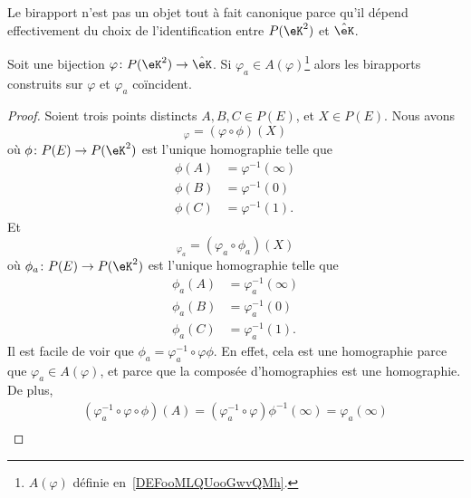 Le birapport n'est pas un objet tout à fait canonique parce qu'il dépend effectivement du choix de l'identification entre \( P(\eK^2)\) et \( \hat\eK\).

\begin{proposition}     \label{PROPooTFMQooIOQGvs}
    Soit une bijection \( \varphi\colon P(\eK^2)\to \hat\eK\). Si \( \varphi_a\in A(\varphi)\)\footnote{\( A(\varphi)\) définie en~\ref{DEFooMLQUooGwvQMh}.} alors les birapports construits sur \( \varphi\) et \( \varphi_a\) coïncident.
\end{proposition}

\begin{proof}
    Soient trois points distincts \( A,B,C\in P(E)\), et \( X\in P(E)\). Nous avons
    \begin{equation}
        [A,B,C,X]_{\varphi}=(\varphi\circ\phi)(X)
    \end{equation}
    où \( \phi\colon P(E)\to P(\eK^2)\) est l'unique homographie telle que
    \begin{subequations}
        \begin{align}
            \phi(A)&=\varphi^{-1}(\infty)\\
            \phi(B)&=\varphi^{-1}(0)\\
            \phi(C)&=\varphi^{-1}(1).
        \end{align}
    \end{subequations}
    Et
    \begin{equation}
        [A,B,C,X]_{\varphi_a}=(\varphi_a\circ\phi_a)(X)
    \end{equation}
    où \( \phi_a\colon P(E)\to P(\eK^2)\) est l'unique homographie telle que
    \begin{subequations}
        \begin{align}
            \phi_a(A)&=\varphi_a^{-1}(\infty)\\
            \phi_a(B)&=\varphi_a^{-1}(0)\\
            \phi_a(C)&=\varphi_a^{-1}(1).
        \end{align}
    \end{subequations}
    Il est facile de voir que \( \phi_a=\varphi_a^{-1}\circ\varphi\phi\). En effet, cela est une homographie parce que \( \varphi_a\in A(\varphi)\), et parce que la composée d'homographies est une homographie. De plus,
    \begin{subequations}
        \begin{align}
            (\varphi_a^{-1}\circ\varphi\circ\phi)(A)=(\varphi_a^{-1}\circ\varphi)\phi^{-1}(\infty)=\varphi_a(\infty)\\

\end{align}
\end{subequations}
\end{proof}
